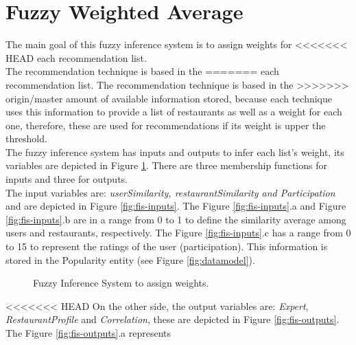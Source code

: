 \section{Fuzzy Weighted Average} 

The main goal of this fuzzy inference system is to assign weights for
<<<<<<< HEAD
each recommendation list.\\ The recommendation technique is based in the
=======
each recommendation list. The recommendation technique is based in the
>>>>>>> origin/master
amount of available information stored, because each technique uses
this information to provide a list of restaurants as well as a weight
for each one, therefore, these are used for  recommendations if its
weight is upper the threshold.  \\The fuzzy inference system has inputs
and outputs to infer each list's weight, its variables are depicted in
Figure  \ref{fig:fis-pesos}.  There are three membership functions for
inputs and three for outputs. \\The input variables are:
\textit{userSimilarity, restaurantSimilarity and Participation} and
are depicted in Figure  \ref{fig:fis-inputs}. The  Figure  \ref{fig:fis-inputs}.a
and  Figure  \ref{fig:fis-inputs}.b  are in a range from 0 to 1 to
define the similarity average among users and restaurants,
respectively. The Figure  \ref{fig:fis-inputs}.c has a range from 0
to 15  to represent the ratings of the user (participation). This
information is stored in the Popularity entity (see 
Figure  \ref{fig:datamodel}).
\begin{figure}
\captionsetup{justification=centering,margin=2cm,font=footnotesize}
\centering
{}
\caption{Fuzzy Inference System to assign weights.}
\label{fig:fis-pesos}       
\end{figure}
<<<<<<< HEAD
On the other side, the output variables are: 
\textit{Expert}, \textit{RestaurantProfile} and \textit{Correlation}, these are depicted in 
Figure  \ref{fig:fis-outputs}. \\The Figure  \ref{fig:fis-outputs}.a  represents
